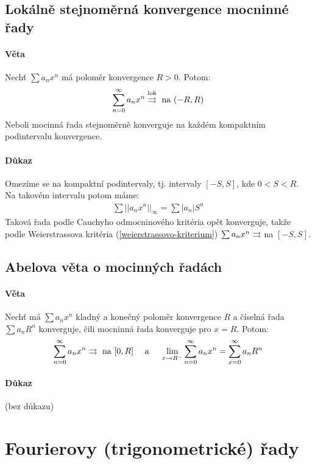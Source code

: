 \documentclass[a4paper,10pt]{article}
\begin{document}
\subsection{Lokálně stejnoměrná konvergence mocninné řady}
\label{lokalne-stejnomerna-konvergence-mr}
\setcounter{equation}{0}
\paragraph{Věta}
Nechť $\sum a_n x^n$ má poloměr konvergence $R > 0$. Potom:
\begin{align*}
	\sum_{n=0}^\infty a_n x^n \overset{\text{lok}}{\rightrightarrows} \text{ na } (-R, R)
\end{align*}
Neboli mocinná řada stejnoměrně konverguje na každém kompaktním podintervalu
konvergence.
\paragraph{Důkaz}
Omezíme se na kompaktní podintervaly, tj. intervaly $[-S,S]$, kde $0 < S < R$.
Na takovém intervalu potom máme:
\begin{align}
	\sum ||a_n x^n||_\infty = \sum |a_n| S^n
\end{align}
Taková řada podle Cauchyho odmocninového kritéria opět konverguje, takže podle
Weierstrassova kritéria (\ref{weierstrassovo-kriterium}) $\sum a_n x^n \rightrightarrows$ na
$[-S, S]$.



\subsection{Abelova věta o mocinných řadách}
\label{abelova-veta}
\setcounter{equation}{0}
\paragraph{Věta}
Nechť má $\sum a_n x^n$ kladný a konečný poloměr konvergence $R$ a číselná řada
$\sum a_n R^n$ konverguje, čili mocninná řada konverguje pro $x = R$. Potom:
\begin{align*}
	\sum_{n=0}^\infty a_n x^n \rightrightarrows \text{ na } [0, R] \quad \text{ a } \quad 
	\lim_{x\to R^-} \sum_{n=0}^\infty a_n x^n = \sum_{x=0}^\infty a_n R^n
\end{align*}
\paragraph{Důkaz}
(bez důkazu)


\section{Fourierovy (trigonometrické) řady}
\setcounter{equation}{0}
\end{document}
